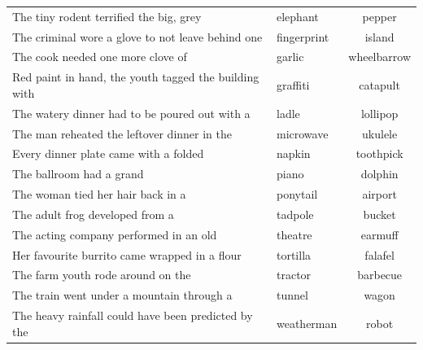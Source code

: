 \begin{table}[!ht]
\begin{tabular}{llc}
The tiny rodent terrified the big, grey                                      & elephant    & pepper      \\
The criminal wore a glove to not leave behind one                            & fingerprint & island      \\
The cook needed one more clove of                                            & garlic      & wheelbarrow \\
Red paint in hand, the youth tagged the building with                        & graffiti    & catapult    \\
The watery dinner had to be poured out with a                                & ladle       & lollipop    \\
The man reheated the leftover dinner in the                                  & microwave   & ukulele     \\
Every dinner plate came with a folded                                        & napkin      & toothpick   \\
The ballroom had a grand                                                     & piano       & dolphin     \\
The woman tied her hair back in a                                            & ponytail    & airport     \\
The adult frog developed from a                                              & tadpole     & bucket      \\
The acting company performed in an old                                       & theatre     & earmuff     \\
Her favourite burrito came wrapped in a flour                                & tortilla    & falafel     \\
The farm youth rode around on the                                            & tractor     & barbecue    \\
The train went under a mountain through a                                    & tunnel      & wagon       \\
The heavy rainfall could have been predicted by the                          & weatherman  & robot      \\
\bottomrule
\end{tabular}
\end{table}

